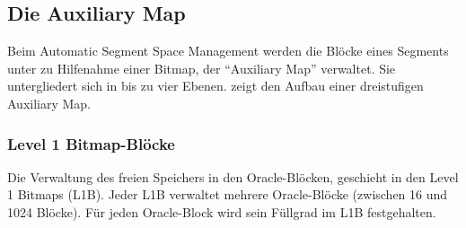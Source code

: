       \subsection{Die Auxiliary Map}
        Beim Automatic Segment Space Management werden die Blöcke eines Segments unter zu Hilfenahme einer Bitmap, der \enquote{Auxiliary Map} verwaltet. Sie untergliedert sich in bis zu vier Ebenen.  zeigt den Aufbau einer dreistufigen Auxiliary Map.
        \subsubsection{Level 1 Bitmap-Blöcke}
          Die Verwaltung des freien Speichers in den Oracle-Blöcken, geschieht in den Level 1 Bitmaps (L1B). Jeder L1B verwaltet mehrere Oracle-Blöcke (zwischen 16 und 1024 Blöcke). Für jeden Oracle-Block wird sein Füllgrad im L1B festgehalten.

